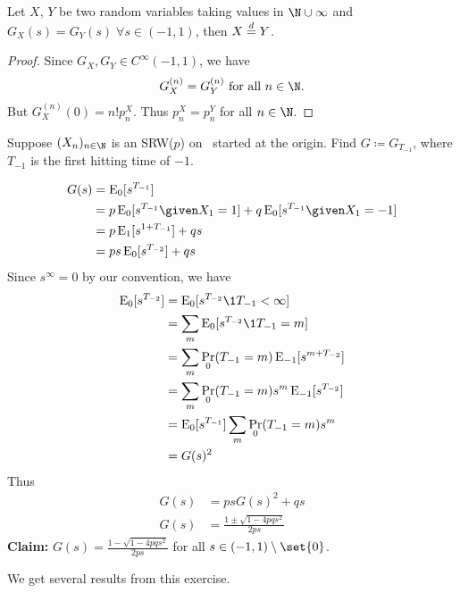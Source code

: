 \begin{theorem} \label{thm:pgf}
    Let $X$, $Y$ be two random variables taking values in $\N \cup \infty$ and
    $G_X(s) = G_Y(s) \;\forall s \in (-1, 1)$, then $X \overset{d}{=} Y$.
\end{theorem}
\begin{proof}
    Since $G_X, G_Y \in C^\infty(-1, 1)$, we have \[
        G_X^{(n)} = G_Y^{(n)} \text{ for all } n \in \N.
    \] But $G_X^{(n)}(0) = n! p_n^X$.
    Thus $p_n^X = p_n^Y$ for all $n \in \N$.
\end{proof}

\begin{exercise}
    Suppose $(X_n)_{n \in \N}$ is an SRW($p$) on \Z\ started at the origin.
    Find $G \coloneq G_{T_{-1}}$,
    where $T_{-1}$ is the first hitting time of $-1$.
\end{exercise}
\begin{solution}
    \begin{align*}
        G(s) &= \E_0[s^{T_{-1}}] \\
            &= p \E_0[s^{T_{-1}} \given X_1 = 1]
                + q \E_0[s^{T_{-1}} \given X_1 = -1] \\
            &= p \E_1[s^{1 + T_{-1}}] + q s \\
            &= p s \E_0[s^{T_{-2}}] + q s
    \end{align*}
    Since $s^\infty = 0$ by our convention, we have \begin{align*}
        \E_0[s^{T_{-2}}] &= \E_0[s^{T_{-2}} \1{T_{-1} < \infty}] \\
            &= \sum_{m} \E_0[s^{T_{-2}} \1{T_{-1} = m}] \\
            &= \sum_{m} \Pr_0(T_{-1} = m) \E_{-1}[s^{m + T_{-2}}] \\
            &= \sum_{m} \Pr_0(T_{-1} = m) s^m \E_{-1}[s^{T_{-2}}] \\
            &= \E_0[s^{T_{-1}}] \sum_{m} \Pr_0(T_{-1} = m) s^m \\
            &= G(s)^2
    \end{align*}
    Thus \begin{align*}
        G(s) &= p s G(s)^2 + q s \\
        G(s) &= \frac{1 \pm \sqrt{1 - 4pq s^2}}{2ps}
    \end{align*}
    \textbf{Claim:} $G(s) = \frac{1 - \sqrt{1 - 4pqs^2}}{2ps}$ for all
    $s \in (-1, 1) \setminus \set{0}$.
\end{solution}
We get several results from this exercise.
